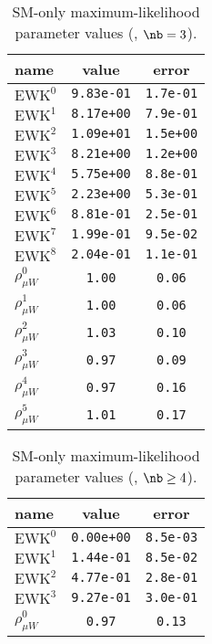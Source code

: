 \begin{table}\centering
\caption{SM-only maximum-likelihood parameter values (\njethigh, $\nb = 3$).}
\label{tab:mlParameterValues3b_ge4j}
\begin{tabular}{lcc}name & value & error \\ \hline
$\mathrm{EWK}^{0}$ & {\tt  9.83e-01} & {\tt  1.7e-01}\\
$\mathrm{EWK}^{1}$ & {\tt  8.17e+00} & {\tt  7.9e-01}\\
$\mathrm{EWK}^{2}$ & {\tt  1.09e+01} & {\tt  1.5e+00}\\
$\mathrm{EWK}^{3}$ & {\tt  8.21e+00} & {\tt  1.2e+00}\\
$\mathrm{EWK}^{4}$ & {\tt  5.75e+00} & {\tt  8.8e-01}\\
$\mathrm{EWK}^{5}$ & {\tt  2.23e+00} & {\tt  5.3e-01}\\
$\mathrm{EWK}^{6}$ & {\tt  8.81e-01} & {\tt  2.5e-01}\\
$\mathrm{EWK}^{7}$ & {\tt  1.99e-01} & {\tt  9.5e-02}\\
$\mathrm{EWK}^{8}$ & {\tt  2.04e-01} & {\tt  1.1e-01}\\
$\rho_{\mu W}^{0}$ & {\tt 1.00} & {\tt 0.06}\\
$\rho_{\mu W}^{1}$ & {\tt 1.00} & {\tt 0.06}\\
$\rho_{\mu W}^{2}$ & {\tt 1.03} & {\tt 0.10}\\
$\rho_{\mu W}^{3}$ & {\tt 0.97} & {\tt 0.09}\\
$\rho_{\mu W}^{4}$ & {\tt 0.97} & {\tt 0.16}\\
$\rho_{\mu W}^{5}$ & {\tt 1.01} & {\tt 0.17}\\
\hline
\end{tabular}
\end{table}

\begin{table}\centering
\caption{SM-only maximum-likelihood parameter values (\njethigh, $\nb \geq 4$).}
\label{tab:mlParameterValuesge4b_ge4j}
\begin{tabular}{lcc}name & value & error \\ \hline
$\mathrm{EWK}^{0}$ & {\tt  0.00e+00} & {\tt  8.5e-03}\\
$\mathrm{EWK}^{1}$ & {\tt  1.44e-01} & {\tt  8.5e-02}\\
$\mathrm{EWK}^{2}$ & {\tt  4.77e-01} & {\tt  2.8e-01}\\
$\mathrm{EWK}^{3}$ & {\tt  9.27e-01} & {\tt  3.0e-01}\\
$\rho_{\mu W}^{0}$ & {\tt 0.97} & {\tt 0.13}\\
\hline
\end{tabular}
\end{table}

